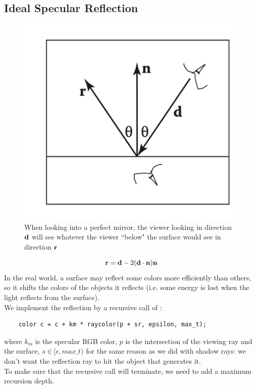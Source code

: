 \documentclass[11pt]{article}
\begin{document}
\subsection{Ideal Specular Reflection}
\begin{figure}[H]
	\centering
	\includegraphics[scale=0.5]{p5}
	\caption{When looking into a perfect mirror, the viewer looking in direction $\textbf{d}$ will see whatever the viewer ``below" the surface would see in direction $\textbf{r}$}
\end{figure}
$$\textbf{r} = \textbf{d} - 2(\textbf{d} \cdot \textbf{n})\textbf{n}$$
In the real world, a surface may reflect some colors more efficiently than others, so it shifts the colors of the objects it reflects (i.e. some energy is lost when the light reflects from the surface). \\
We implement the reflection by a recursive call of :
\begin{framed}
\begin{verbatim}
	color c = c + km * raycolor(p + sr, epsilon, max_t);
\end{verbatim}
\end{framed}
\noindent where $k_m$ is the specular RGB color, $p$ is the intersection of the viewing ray and the surface, $s \in [\epsilon, max\_t)$ for the same reason as we did with shadow rays: we don't want the reflection ray to hit the object that generates it.\\
To make sure that the recursive call will terminate, we need to add a maximum recursion depth.
\end{document}
